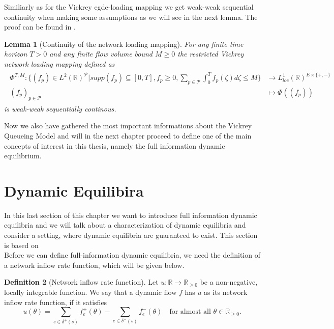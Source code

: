 \documentclass[reqno,openany]{amsbook}
\theoremstyle{definition}
\newtheorem{definition}{Definition}[chapter]
\theoremstyle{plain}
\newtheorem{lemma}[definition]{Lemma}
\begin{document}
Similiarly as for the Vickrey egde-loading mapping we get weak-weak sequential continuity when making some assumptions as we will see in the next lemma. The proof can be found in \cite[Lemma 18]{CCL1}.

\begin{lemma}[Continuity of the network loading mapping]
For any finite time horizon $T > 0$ and any finite flow volume bound $M \geq 0$ the restricted Vickrey network loading mapping defined as 
\begin{align}
	\begin{split}
		\Phi^{T, M}:\{(f_p) \in L^2(\mathbb{R})^{\mathcal{P}} \vert supp(f_p) \subseteq [0, T],
		f_p \geq 0, \sum_{p \in \mathcal{P}}\int_0^T f_p(\zeta) d\zeta \leq M \} &\to L_{loc}^1(\mathbb{R})^{E \times \{+,-\}}			\\
		(f_p)_{p \in \mathcal{P}} &\mapsto \Phi((f_p))
	\end{split}
\end{align}
is weak-weak sequentially continous.
\end{lemma}

Now we also have gathered the most important informations about the Vickrey Queueing Model and will in the next chapter proceed to define one of the main concepts of interest in this thesis, namely the full information dynamic equilibrium.

\section{Dynamic Equilibira}
In this last section of this chapter we want to introduce full information dynamic equilibria and we will talk about a characterization of dynamic equilibria and consider a setting, where dynamic equilibria are guaranteed to exist. This section is based on \cite{ZM1}\\
Before we can define full-information dynamic equilibria, we need the definition of a network inflow rate function, which will be given below.

\begin{definition}[Network inflow rate function]
Let  $u: \mathbb{R} \to \mathbb{R}_{\geq 0}$ be a non-negative, locally integrable function. We say that a dynamic flow $f$ has $u$ as its network inflow rate function, if it satisfies
\[ u(\theta) = \sum_{e \in \delta^+(s)} f_e^+(\theta) - \sum_{e \in \delta^-(s)} f_e^-(\theta) \quad \text{for almost all $\theta \in \mathbb{R}_{\geq 0}$.}\]
\end{definition}
\end{document}
